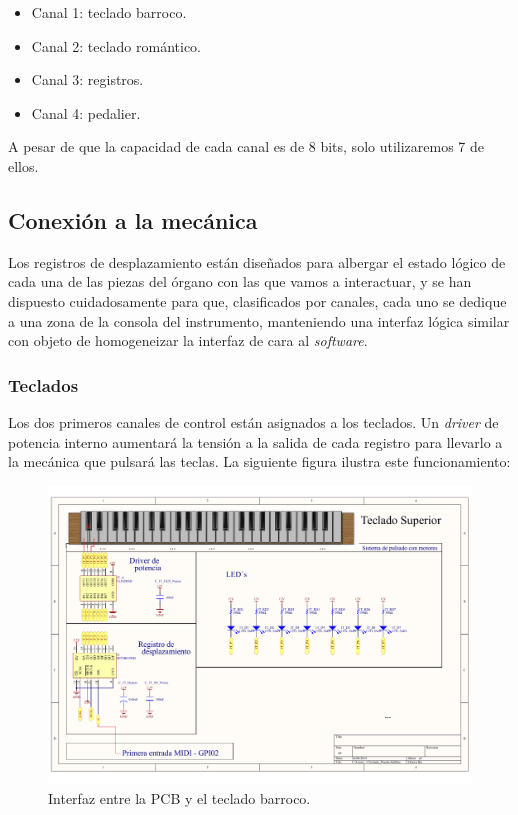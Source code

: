 \begin{itemize}
	\item Canal 1: teclado barroco.
	\item Canal 2: teclado romántico.
	\item Canal 3: registros.
	\item Canal 4: pedalier.
\end{itemize}

A pesar de que la capacidad de cada canal es de 8 bits, solo utilizaremos 7 de ellos.

\subsection{Conexión a la mecánica}

Los registros de desplazamiento están diseñados para albergar el estado lógico de cada una de las piezas del órgano con las que vamos a interactuar, y se han dispuesto cuidadosamente para que, clasificados por canales, cada uno se dedique a una zona de la consola del instrumento, manteniendo una interfaz lógica similar con objeto de homogeneizar la interfaz de cara al \textit{software}.

\subsubsection{Teclados}

Los dos primeros canales de control están asignados a los teclados. Un \textit{driver} de potencia interno aumentará la tensión a la salida de cada registro para llevarlo a la mecánica que pulsará las teclas. La siguiente figura ilustra este funcionamiento:

\smallskip

\begin{figure}[H]
	\noindent \begin{centering}
		\includegraphics[width=\linewidth*2/3]{capitulo3/pcb_teclado}
		\par\end{centering}
	\smallskip
	\caption{\label{fig:pcb_teclado} Interfaz entre la \acrshort{PCB} y el teclado barroco.}
\end{figure} 

